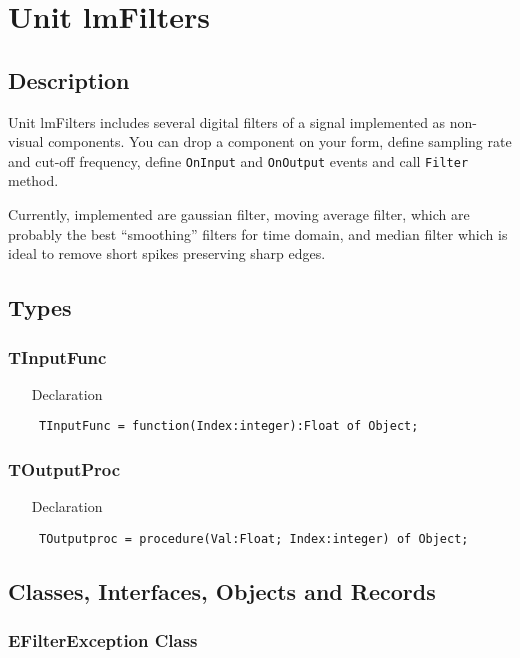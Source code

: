 \documentclass[12pt,a4paper,oneside]{report}
\newcommand{\declarationitem}[1]{{\addfontfeatures{FakeBold=1.3} #1}}
\newcommand{\code}[1]{\texttt{#1}}
\begin{document}
\chapter{Unit lmFilters}
\label{lmfilters}
\section{Description}
Unit lmFilters includes several digital filters of a signal implemented as non-visual components. You can drop a component on your form, define sampling rate and cut-off frequency, define \code{OnInput} and \code{OnOutput} events and call \code{Filter} method.

Currently, implemented are gaussian filter, moving average filter, which are probably the best ``smoothing'' filters for time domain, and median filter which is ideal to remove short spikes preserving sharp edges.

\section{Types}
\subsection{TInputFunc}
\label{lmfilters-TInputFunc}
\begin{itemize}\item[\declarationitem{Declaration}\hfill]
	\begin{flushleft}
		\code{
			TInputFunc = function(Index:integer):Float of Object;}
	\end{flushleft}
\end{itemize}
\subsection{TOutputProc}
\label{lmfilters-TOutputproc}
\begin{itemize}\item[\declarationitem{Declaration}\hfill]
	\begin{flushleft}
		\code{
			TOutputproc = procedure(Val:Float; Index:integer) of Object;}
	\end{flushleft}
\end{itemize}
\section{Classes, Interfaces, Objects and Records}
\subsection{EFilterException Class}
\label{lmfilters.EFilterException}
\end{document}
